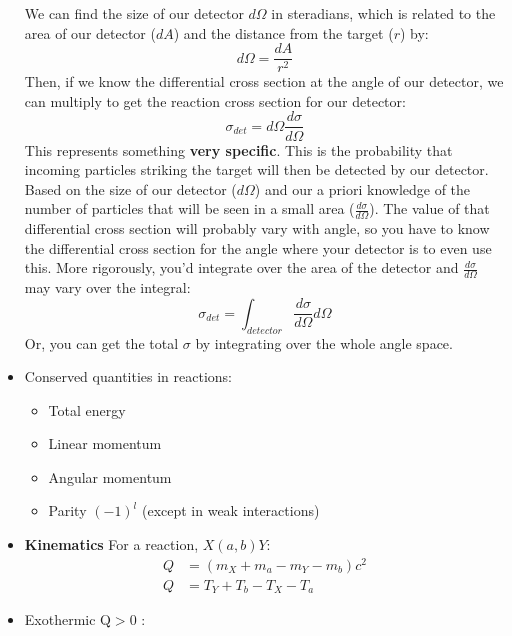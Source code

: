 \documentclass[letter]{article}
\begin{document}
\begin{itemize}
We can
    find the size of our detector $d\Omega$ in steradians, which is
    related to the area of our detector ($dA$) and the distance from
    the target ($r$) by:
    \begin{equation*}
      d\Omega = \frac{dA}{r^2}
    \end{equation*}
    Then, if we know the differential cross section at the angle of
    our detector, we can multiply to get the reaction cross section
    for our detector:
    \begin{equation*}
      \sigma_{det} = d\Omega\frac{d\sigma}{d\Omega}
    \end{equation*}
    This represents something \textbf{very specific}. This is the
    probability that incoming particles striking the target will then
    be detected by our detector. Based on the size of our detector
    ($d\Omega$) and our a priori knowledge of the number of particles
    that will be seen in a small area ($\frac{d\sigma}{d\Omega}$). The
    value of that differential cross section will probably vary with
    angle, so you have to know the differential cross section for the
    angle where your detector is to even use this. More rigorously,
    you'd integrate over the area of the detector and
    $\frac{d\sigma}{d\Omega}$ may vary over the integral:
    \begin{equation*}
      \sigma_{det} = \int_{detector}\frac{d\sigma}{d\Omega}d\Omega
    \end{equation*}
    Or, you can get the total $\sigma$ by integrating over the whole
    angle space.
\item Conserved quantities in reactions:
  \begin{itemize}
  \item Total energy
  \item Linear momentum
  \item Angular momentum
  \item Parity $(-1)^l$ (except in weak interactions)
\end{itemize}
\item \textbf{Kinematics} For a reaction, $X(a,b)Y$:
  \begin{equation*}
    \begin{split}
      Q&= (m_{X}+m_{a}-m_{Y}-m_{b})c^{2}\\
      Q& =T_{Y}+T_{b}-T_{X}-T_{a}
\end{split}
\end{equation*}
\item Exothermic Q$>$0 :
  \begin{equation*}

\end{equation*}
\end{itemize}
\end{document}

